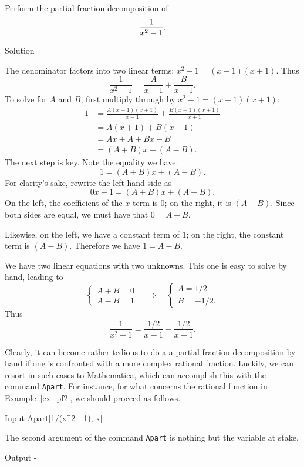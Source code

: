 \begin{example}\label{ex_pf2}
Perform the partial fraction decomposition of
$$\displaystyle \frac{1}{x^2-1}.$$

Solution 

The denominator factors into two linear terms: $x^2-1 = (x-1)(x+1)$. Thus 
$$\frac{1}{x^2-1} = \frac{A}{x-1} + \frac{B}{x+1}.$$
To solve for $A$ and $B$, first multiply through by $x^2-1 = (x-1)(x+1)$:
\begin{align*}
1 &= \frac{A(x-1)(x+1)}{x-1}+\frac{B(x-1)(x+1)}{x+1} \\[0.2cm]
	&= A(x+1) + B(x-1)\\[0.2cm]
	&= Ax+A + Bx-B \\[0.2cm]
	&= (A+B)x + (A-B).
\end{align*}
The next step is key. Note the equality we have:
$$1 = (A+B)x+(A-B).$$
For clarity's sake, rewrite the left hand side as
$$0x+1 = (A+B)x+(A-B).$$
On the left, the coefficient of the $x$ term is 0; on the right, it is $(A+B)$. Since both sides are equal, we must have that $0=A+B$. 

Likewise, on the left, we have a constant term of 1; on the right, the constant term is $(A-B)$. Therefore we have $1=A-B$.

We have two linear equations with two unknowns. This one is easy to solve by hand, leading to 
$$\begin{cases} A+B = 0 \\ A-B = 1 \end{cases} \quad\Rightarrow\quad \begin{cases} A=1/2 \\ B = -1/2.\end{cases}$$
Thus $$\frac{1}{x^2-1} = \frac{1/2}{x-1}-\frac{1/2}{x+1}.$$
\end{example}
\ifmathematica
Clearly, it can become rather tedious to do a a partial fraction decomposition by hand if one is confronted with a more complex rational fraction. Luckily, we can resort in such cases to Mathematica, which can accomplish this with the command \lstinline{Apart}. For instance, for what concerns the rational function in Example~\eqref{ex_pf2}, we should proceed as follows. 
	\begin{mdframed}[default,backgroundcolor=gray!40,roundcorner=8pt]
\begin{mmaCell}[morefunctionlocal={x}]{Input}
  Apart[1/(x^2 - 1), x]
\end{mmaCell}
The second argument of the command \lstinline{Apart} is nothing but the variable at stake. 
\begin{mmaCell}{Output}
  -
\end{mmaCell}
\end{mdframed}
